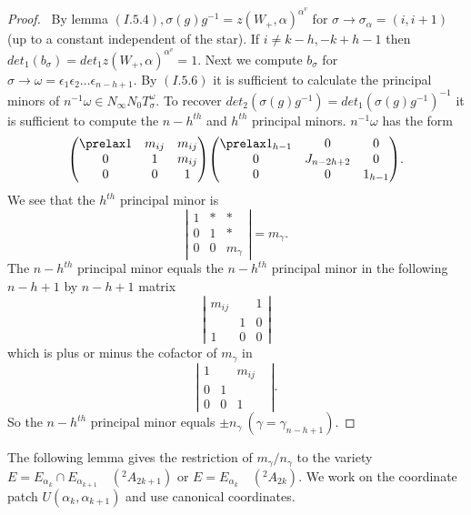 \documentclass{memo-l}
\theoremstyle{definition}
\theoremstyle{remark}
\numberwithin{section}{chapter}
\numberwithin{equation}{chapter}
\begin{document}
\begin{proof} \ By lemma $(I.5.4), {\sigma}(g)g^{-1}  = 
z(W_{+},{\alpha})^{{\alpha}^{v}}$ for ${\sigma} {\to}
{\sigma}_{{\alpha}}  =  (i,i+1)$ (up to a constant independent of the star).
If $i \ne  k-h, -k+h-1$ then $det_{1}(b_{{\sigma}})  = 
det_{1}z(W_{+},{\alpha})^{{\alpha}^{v}} = 1$.  Next we compute
$b_{{\sigma}}$ for ${\sigma} {\to} {\omega}  = 
{\epsilon}_{1}{\epsilon}_{2}\ldots {\epsilon}_{n-h+1}$.  By $(I.5.6)$ it is
sufficient to calculate the principal minors of $n^{-1}{\omega}  \in 
N_{{\infty}}N_{0}T_{{\sigma}}^{\omega}.$ To recover
$det_{2}({\sigma}(g)g^{-1})  =  det_{1}({\sigma}(g)g^{-1})^{-1}$ it is
sufficient to compute the $n-h^{th}$ and $h^{th}$ principal minors.
$n^{-1}{\omega}$ has the form
$$
{\begin{pmatrix} \prelax  1 & m_{ij} & m_{ij} \\ 0 & 1 & m_{ij} \\ 0 & 0 & 1 \end{pmatrix}}
{\begin{pmatrix} \prelax   1_{h-1} & 0 & 0 \\ 0 & J_{n-2h+2} & 0 \\ 0 & 0 & 1_{h-1} \end{pmatrix}} .
$$
We see that the $h^{th}$ principal minor is
$$
\left\vert 
\begin{matrix} 1 & * & * \\ 0 & 1 & * \\ 0 & 0 & m_\gamma 
\end{matrix}
\right\vert 
= m_\gamma.
$$
The $n-h^{th}$ principal minor equals the $n-h^{th}$ principal minor in the
following $n-h+1$ by $n-h+1$ matrix
$$
\left\vert
\begin{matrix}
m_{ij} & & 1 \\ & 1 & 0 \\ 1 & 0 & 0 
\end{matrix}
\right\vert 
$$
which is plus or minus the cofactor of $m_{{\gamma}}$ in
$$
\left\vert
\begin{matrix} 1 && m_{ij} \\ 0 & 1 && \\ 0 & 0 & 1 \end{matrix}
\right\vert.
$$
So the $n-h^{th}$ principal minor equals ${\pm}n_{{\gamma}}\  ({\gamma}
 = {\gamma}_{n-h+1})$.
\end{proof} 

{\medskip} 

The following lemma gives the restriction of
$m_{{\gamma}}/n_{{\gamma}}$ to the variety $E  =  E_{{\alpha_k}} {\cap}
E_{{\alpha_{k+1}}}$\ \  $(^{2}A_{2k+1})$ or $E  =  E_{{\alpha_k}}$\ \ 
$(^{2}A_{2k})$.
We work on the coordinate patch $U({\alpha}_{k},{\alpha}_{k+1})$ and use
canonical coordinates.
\end{document}
